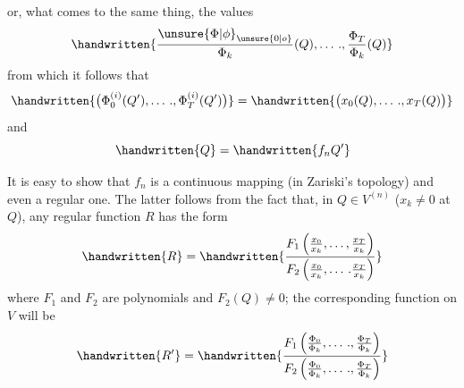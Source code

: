 or, what comes to the same thing, the values
\[
\handwritten{\frac{\unsure{\Phi|\phi}_{\unsure{0|o}}}{\Phi_k}(Q),\ldots\,.,\frac{\Phi_T}{\Phi_k}(Q)}
\]
from which it follows that
\[
\handwritten{\bigl(\Phi_0^{(i)}(Q'),\ldots\,.,\Phi_T^{(i)}(Q')\bigr)}=\handwritten{\bigl(x_0(Q),\ldots\,.,x_T(Q)\bigr)}
\]
and
\[
\handwritten{Q}=\handwritten{f_nQ'}
\]

It is easy to show that $f_n$ is a continuous mapping
(in Zariski's topology) and even a regular one. The latter
follows from the fact that, in $Q\in V^{(n)}$ ($x_k\ne 0$ at $Q$),
any regular function $R$ has the form
\[
\handwritten{R}=\handwritten{\frac{F_1\left(\frac{x_0}{x_k},\ldots,\frac{x_T}{x_k}\right)}{F_2\left(\frac{x_0}{x_k},\ldots\,.\frac{x_T}{x_k}\right)}}
\]
where $F_1$ and $F_2$ are polynomials and $F_2(Q)\ne0$; the
corresponding function on $V$ will be
\[
\handwritten{R'}=\handwritten{\frac{F_1\left(\frac{\Phi_0}{\Phi_k},\ldots\,.,\frac{\Phi_T}{\Phi_k}\right)}{F_2\left(\frac{\Phi_0}{\Phi_k},\ldots\,.,\frac{\Phi_T}{\Phi_k}\right)}}
\]
